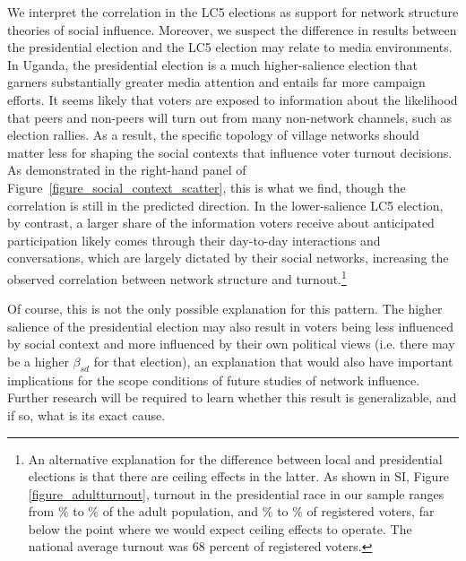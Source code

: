 \documentclass[12pt]{article}
\begin{document}
We interpret the correlation in the LC5 elections as support for network structure theories of social influence. Moreover, we suspect the difference in results between the presidential election and the LC5 election may relate to media environments. In Uganda, the presidential election is a much higher-salience election that garners substantially greater media attention and entails far more campaign efforts. It seems likely that voters are exposed to information about the likelihood that peers and non-peers will turn out from many non-network channels, such as election rallies. As a result, the specific topology of village networks should matter less for shaping the social contexts that influence voter turnout decisions.  As demonstrated in the right-hand panel of Figure~\ref{figure_social_context_scatter}, this is what we find, though the correlation is still in the predicted direction. In the lower-salience LC5 election, by contrast, a larger share of the information voters receive about anticipated participation likely comes through their day-to-day interactions and conversations, which are largely dictated by their social networks, increasing the observed correlation between network structure and turnout.\footnote{An alternative explanation for the difference between local and presidential elections is that there are ceiling effects in the latter. As shown in SI, Figure \ref{figure_adultturnout}, turnout in the presidential race in our sample ranges from \unskip\% to  \unskip\% of the adult population, and \unskip\% to \unskip\% of registered voters, far below the point where we would expect ceiling effects to operate. The national average turnout was 68 percent of registered voters.}

Of course, this is not the only possible explanation for this pattern. The higher salience of the presidential election may also result in voters being less influenced by social context and more influenced by their own political views (i.e. there may be a higher $\beta_{sd}$ for that election), an explanation that would also have important implications for the scope conditions of future studies of network influence. Further research will be required to learn whether this result is generalizable, and if so, what is its exact cause.
\end{document}
